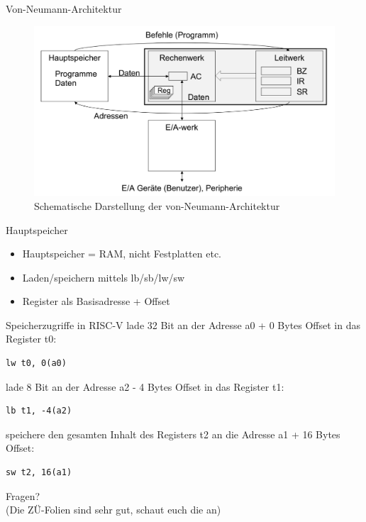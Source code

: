 \documentclass[
  german,            %
  aspectratio=169,    %
]{tumbeamer}
\begin{document}
\begin{frame}[c]{Von-Neumann-Architektur}{}
  \begin{figure}[h]
    \includegraphics[height=0.75\textheight]{../resources/w03_von_Neumann.png}
    \caption{Schematische Darstellung der von-Neumann-Architektur}
  \end{figure}
\end{frame}

\begin{frame}[fragile, c]{Hauptspeicher}{}
  \begin{itemize}
    \item Hauptspeicher = RAM, nicht Festplatten etc. 
    \item Laden/speichern mittels lb/sb/lw/sw
    \item Register als Basisadresse + Offset
  \end{itemize}  
\end{frame}

\begin{frame}[fragile, c]{Speicherzugriffe in RISC-V}{}
  lade 32 Bit an der Adresse a0 + 0 Bytes Offset in das Register t0: 
  \begin{verbatim}lw t0, 0(a0)\end{verbatim}
  lade 8 Bit an der Adresse a2 - 4 Bytes Offset in das Register t1: 
  \begin{verbatim}lb t1, -4(a2)\end{verbatim}
  speichere den gesamten Inhalt des Registers t2 an die Adresse a1 + 16 Bytes Offset:
  \begin{verbatim}sw t2, 16(a1)\end{verbatim}
\end{frame}

\begin{frame}[c]{}{}
  \begin{center}
    \LARGE Fragen?\\
    \Large (Die ZÜ-Folien sind sehr gut, schaut euch die an)
  \end{center}
\end{frame}
\end{document}
